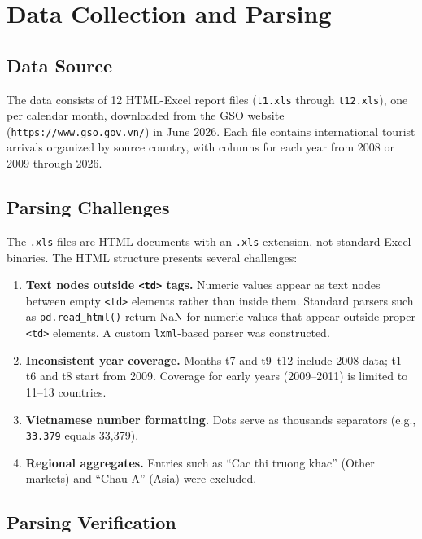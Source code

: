 \documentclass[
]{article}
\begin{document}
\section{Data Collection and Parsing}\label{data-collection-and-parsing}

\subsection{Data Source}\label{data-source}

The data consists of 12 HTML-Excel report files (\texttt{t1.xls} through
\texttt{t12.xls}), one per calendar month, downloaded from the GSO
website (\texttt{https://www.gso.gov.vn/}) in June 2026. Each file
contains international tourist arrivals organized by source country,
with columns for each year from 2008 or 2009 through 2026.

\subsection{Parsing Challenges}\label{parsing-challenges}

The \texttt{.xls} files are HTML documents with an \texttt{.xls}
extension, not standard Excel binaries. The HTML structure presents
several challenges:

\begin{enumerate}
\def\labelenumi{\arabic{enumi}.}
\item
  \textbf{Text nodes outside \texttt{\textless{}td\textgreater{}} tags.}
  Numeric values appear as text nodes between empty
  \texttt{\textless{}td\textgreater{}} elements rather than inside them.
  Standard parsers such as \texttt{pd.read\_html()} return NaN for
  numeric values that appear outside proper \texttt{<td>} elements. A
  custom \texttt{lxml}-based parser was constructed.
\item
  \textbf{Inconsistent year coverage.} Months t7 and t9--t12 include
  2008 data; t1--t6 and t8 start from 2009. Coverage for early years
  (2009--2011) is limited to 11--13 countries.
\item
  \textbf{Vietnamese number formatting.} Dots serve as thousands
  separators (e.g., \texttt{33.379} equals 33,379).
\item
  \textbf{Regional aggregates.} Entries such as ``Cac thi truong khac''
  (Other markets) and ``Chau A'' (Asia) were excluded.
\end{enumerate}

\subsection{Parsing Verification}\label{parsing-verification}
\end{document}
